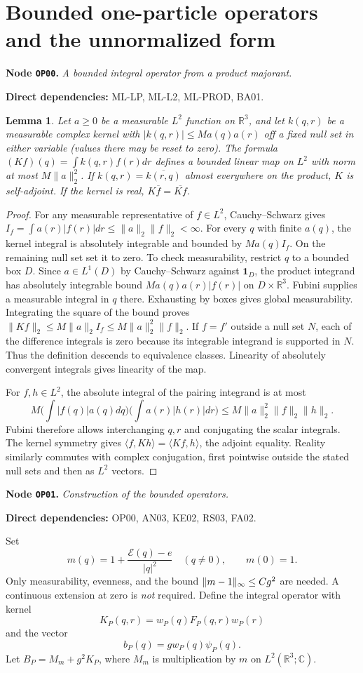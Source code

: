 \documentclass[11pt,a4paper]{article}
\newtheorem{lemma}[theorem]{Lemma}
\theoremstyle{remark}\newtheorem{remark}[theorem]{Remark}
\newcommand{\R}{\mathbb R}\newcommand{\C}{\mathbb C}\newcommand{\N}{\mathbb N}
\newcommand{\abs}[1]{\lvert #1\rvert}\newcommand{\rankone}[2]{\lvert #1\rangle\langle #2\rvert}
\newcommand{\node}[3]{\par\Needspace{6\baselineskip}\smallskip\hypertarget{node:#1}{}\label{nodepage:#1}\noindent\textbf{Node \texttt{#1}.} \textit{#2.}\par\noindent\textbf{Direct dependencies:} #3.\par}
\newcommand{\Ecal}{\mathcal E}
\begin{document}
\section{Bounded one-particle operators and the unnormalized form}\label{sec:boundedkernel}
\node{OP00}{A bounded integral operator from a product majorant}{ML-LP, ML-L2, ML-PROD, BA01}
\begin{lemma}\label{lem:dominatedkernel}
Let $a\geq0$ be a measurable $L^2$ function on $\R^3$, and let $k(q,r)$ be a measurable complex kernel with $|k(q,r)|\leq M a(q)a(r)$ off a fixed null set in either variable (values there may be reset to zero). The formula
$(Kf)(q)=\int k(q,r)f(r)dr$ defines a bounded linear map on $L^2$ with norm at most $M\|a\|_2^2$. If $k(q,r)=\overline{k(r,q)}$ almost everywhere on the product, $K$ is self-adjoint. If the kernel is real, $K\overline f=\overline{Kf}$.
\end{lemma}
\begin{proof}
For any measurable representative of $f\in L^2$, Cauchy--Schwarz gives
$I_f=\int a(r)|f(r)|dr\leq\|a\|_2\|f\|_2<\infty$.
For every $q$ with finite $a(q)$, the kernel integral is absolutely integrable and bounded by $Ma(q)I_f$. On the remaining null set set it to zero. To check measurability, restrict $q$ to a bounded box $D$. Since $a\in L^1(D)$ by Cauchy--Schwarz against $\mathbf1_D$, the product integrand has absolutely integrable bound $Ma(q)a(r)|f(r)|$ on $D\times\R^3$. Fubini supplies a measurable integral in $q$ there. Exhausting by boxes gives global measurability. Integrating the square of the bound proves
$\|Kf\|_2\leq M\|a\|_2I_f\leq M\|a\|_2^2\|f\|_2$.
If $f=f'$ outside a null set $N$, each of the difference integrals is zero because its integrable integrand is supported in $N$. Thus the definition descends to equivalence classes. Linearity of absolutely convergent integrals gives linearity of the map.

For $f,h\in L^2$, the absolute integral of the pairing integrand is at most
\[
 M\Big(\int|f(q)|a(q)dq\Big)
    \Big(\int a(r)|h(r)|dr\Big)
 \leq M\|a\|_2^2\|f\|_2\|h\|_2.
\]
Fubini therefore allows interchanging $q,r$ and conjugating the scalar integrals. The kernel symmetry gives $\langle f,Kh\rangle=\langle Kf,h\rangle$, the adjoint equality. Reality similarly commutes with complex conjugation, first pointwise outside the stated null sets and then as $L^2$ vectors.
\end{proof}


\node{OP01}{Construction of the bounded operators}{OP00, AN03, KE02, RS03, FA02}
Set
\[
 m(q)=1+\frac{\Ecal(q)-e}{\abs q^2}\quad(q\ne0),\qquad m(0)=1.
\]
Only measurability, evenness, and the bound $\lVert m-1\rVert_\infty\leq Cg^2$ are needed. A continuous extension at zero is \emph{not} required. Define the integral operator with kernel
\[
 K_P(q,r)=w_P(q)F_P(q,r)w_P(r)
\]
and the vector
\[
 b_P(q)=g w_P(q)\psi_P(q).
\]
Let $B_P=M_m+g^2K_P$, where $M_m$ is multiplication by $m$ on $L^2(\R^3;\C)$.
\end{document}
